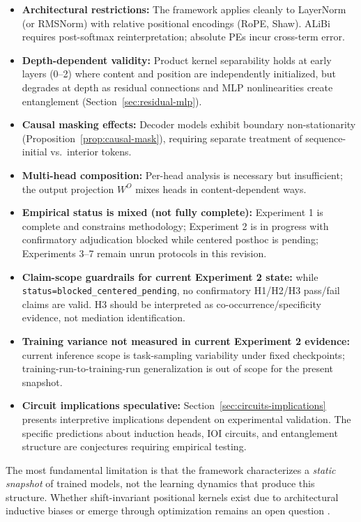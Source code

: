 \documentclass[11pt]{article}
\theoremstyle{definition}
\begin{document}
\begin{itemize}
    \item \textbf{Architectural restrictions:} The framework applies cleanly to LayerNorm (or RMSNorm) with relative positional encodings (RoPE, Shaw). ALiBi requires post-softmax reinterpretation; absolute PEs incur cross-term error.
    \item \textbf{Depth-dependent validity:} Product kernel separability holds at early layers (0--2) where content and position are independently initialized, but degrades at depth as residual connections and MLP nonlinearities create entanglement (Section~\ref{sec:residual-mlp}).
    \item \textbf{Causal masking effects:} Decoder models exhibit boundary non-stationarity (Proposition~\ref{prop:causal-mask}), requiring separate treatment of sequence-initial vs.\ interior tokens.
    \item \textbf{Multi-head composition:} Per-head analysis is necessary but insufficient; the output projection $W^O$ mixes heads in content-dependent ways.
    \item \textbf{Empirical status is mixed (not fully complete):} Experiment 1 is complete and constrains methodology; Experiment 2 is in progress with confirmatory adjudication blocked while centered posthoc is pending; Experiments 3--7 remain unrun protocols in this revision.
    \item \textbf{Claim-scope guardrails for current Experiment 2 state:} while \texttt{status=blocked\_centered\_pending}, no confirmatory H1/H2/H3 pass/fail claims are valid. H3 should be interpreted as co-occurrence/specificity evidence, not mediation identification.
    \item \textbf{Training variance not measured in current Experiment 2 evidence:} current inference scope is task-sampling variability under fixed checkpoints; training-run-to-training-run generalization is out of scope for the present snapshot.
    \item \textbf{Circuit implications speculative:} Section~\ref{sec:circuits-implications} presents interpretive implications dependent on experimental validation. The specific predictions about induction heads, IOI circuits, and entanglement structure are conjectures requiring empirical testing.
\end{itemize}

The most fundamental limitation is that the framework characterizes a \emph{static snapshot} of trained models, not the learning dynamics that produce this structure. Whether shift-invariant positional kernels exist due to architectural inductive biases or emerge through optimization remains an open question \cite{bietti2024spectral}.
\end{document}
